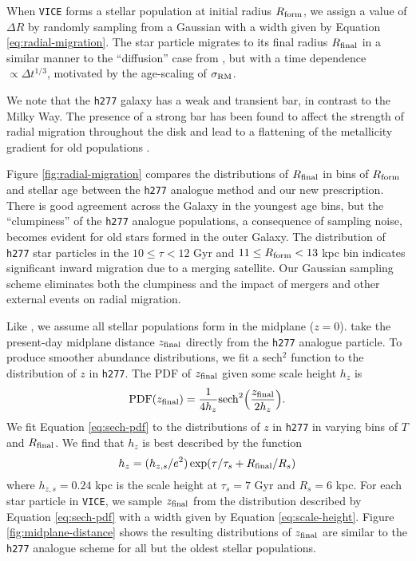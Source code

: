 \documentclass[twocolumn,twocolappendix,linenumbers]{aastex631}
\newcommand{\vice}{{\tt VICE}\xspace}
\newcommand{\hydro}{{\tt h277}\xspace}
\begin{document}
When \vice forms a stellar population at initial radius $R_{\rm form}$, we assign a value of $\Delta R$ by randomly sampling from a Gaussian with a width given by Equation \ref{eq:radial-migration}. The star particle migrates to its final radius $R_{\rm final}$ in a similar manner to the ``diffusion'' case from , but with a time dependence $\propto \Delta t^{1/3}$, motivated by the age-scaling of $\sigma_{\rm RM}$.

We note that the \hydro galaxy has a weak and transient bar, in contrast to the Milky Way. The presence of a strong bar has been found to affect the strength of radial migration throughout the disk \citep[e.g.,][]{Brunetti2011-BarredSpiralDiffusion} and lead to a flattening of the metallicity gradient for old populations \citep{Okalidis2022-AurigaMigration}.

Figure \ref{fig:radial-migration} compares the distributions of $R_{\rm final}$ in bins of $R_{\rm form}$ and stellar age between the \hydro analogue method and our new prescription. There is good agreement across the Galaxy in the youngest age bins, but the ``clumpiness'' of the \hydro analogue populations, a consequence of sampling noise, becomes evident for old stars formed in the outer Galaxy. The distribution of \hydro star particles in the $10\leq\tau<12$ Gyr and $11\leq R_{\rm form}<13$ kpc bin indicates significant inward migration due to a merging satellite. Our Gaussian sampling scheme eliminates both the clumpiness and the impact of mergers and other external events on radial migration.

Like , we assume all stellar populations form in the midplane ($z=0$).  take the present-day midplane distance $z_{\rm final}$ directly from the \hydro analogue particle. To produce smoother abundance distributions, we fit a sech$^2$ function \citep{Spitzer1942} to the distribution of $z$ in \hydro. The PDF of $z_{\rm final}$ given some scale height $h_z$ is
\begin{equation}
    {\rm PDF}(z_{\rm final}) = \frac{1}{4 h_z} {\rm sech}^2\Big(\frac{z_{\rm final}}{2 h_z}\Big).
    \label{eq:sech-pdf}
\end{equation}
We fit Equation \ref{eq:sech-pdf} to the distributions of $z$ in \hydro in varying bins of $T$ and $R_{\rm final}$. We find that $h_z$ is best described by the function
\begin{equation}
    h_z = (h_{z,s}/e^2) \exp(\tau/\tau_s + R_{\rm final}/R_s)
    \label{eq:scale-height}
\end{equation}
where $h_{z,s}=0.24$ kpc is the scale height at $\tau_s=7$ Gyr and $R_s=6$ kpc.
For each star particle in \vice, we sample $z_{\rm final}$ from the distribution described by Equation \ref{eq:sech-pdf} with a width given by Equation \ref{eq:scale-height}. Figure \ref{fig:midplane-distance} shows the resulting distributions of $z_{\rm final}$ are similar to the \hydro analogue scheme for all but the oldest stellar populations.
\end{document}
